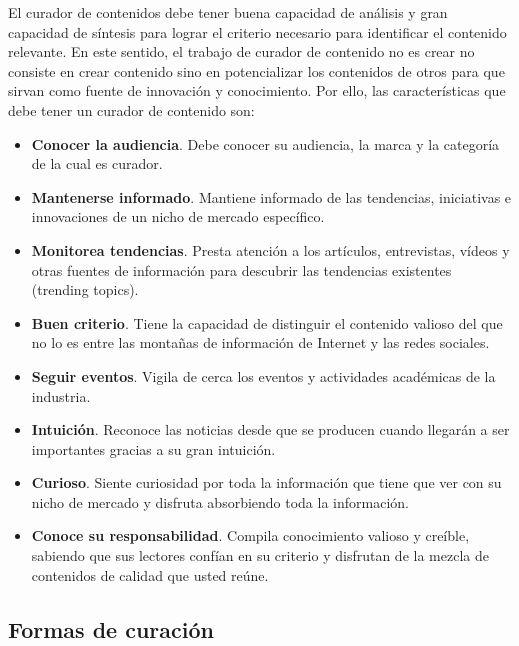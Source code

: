 El curador de contenidos debe tener buena capacidad de análisis y gran capacidad de síntesis para lograr el criterio necesario para identificar el contenido relevante. En este sentido, el trabajo de curador de contenido no es crear no consiste en crear contenido sino en potencializar los contenidos de otros para que sirvan como fuente de innovación y conocimiento. Por ello, las características que debe tener un curador de contenido son:
\begin{itemize}
    \item \textbf{Conocer la audiencia}. Debe conocer su audiencia, la marca y la categoría de la cual es curador.
    \item \textbf{Mantenerse informado}. Mantiene informado de las tendencias, iniciativas e innovaciones de un nicho de mercado específico.
    \item \textbf{Monitorea tendencias}. Presta atención a los artículos, entrevistas, vídeos y otras fuentes de información para descubrir las tendencias existentes (trending topics).
    \item \textbf{Buen criterio}. Tiene la capacidad de distinguir el contenido valioso del que no lo es entre las montañas de información de Internet y las redes sociales.
    \item \textbf{Seguir eventos}. Vigila de cerca los eventos y actividades académicas de la industria.
    \item \textbf{Intuición}. Reconoce las noticias desde que se producen cuando llegarán a ser importantes gracias a su gran intuición.
    \item \textbf{Curioso}. Siente curiosidad por toda la información que tiene que ver con su nicho de mercado y disfruta absorbiendo toda la información.
    \item \textbf{Conoce su responsabilidad}. Compila conocimiento valioso y creíble, sabiendo que sus lectores confían en su criterio y disfrutan de la mezcla de contenidos de calidad que usted reúne.
\end{itemize}

\subsection{Formas de curación}

